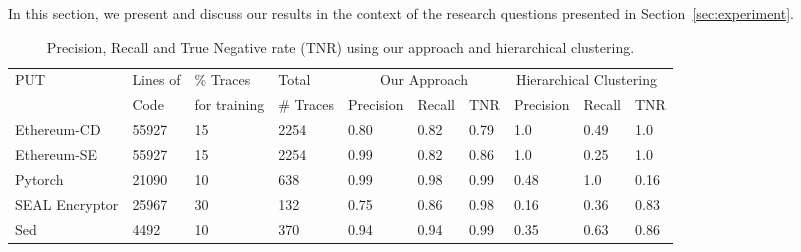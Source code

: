 
In this section, we present and discuss our results in the context of the research questions presented in Section~\ref{sec:experiment}.

\begin{table}[]
	\centering
	\small
	\begin{tabular}{|l|l|l|l|l|l|l@{\hskip 5mm}|l|l|l|}
		\hline
		PUT & Lines of & \% Traces & Total & \multicolumn{3}{c|}{Our Approach} & \multicolumn{3}{c|}{Hierarchical Clustering~\cite{almaghairbe2017separating}}\\
		& Code & for training &  \# Traces      & {Precision} & {Recall} & {TNR} & {Precision} & {Recall} & {TNR}\\ 
		\hline
		Ethereum-CD & 55927 & 15 & 2254 & 0.80 & 0.82 & 0.79 & 1.0 & 0.49 & 1.0 \\ %
		Ethereum-SE & 55927 & 15 & 2254 & 0.99 & 0.82 & 0.86 & 1.0 & 0.25 & 1.0 \\ %
		Pytorch & 21090 & 10 & 638 & 0.99 & 0.98 & 0.99 & 0.48 & 1.0 & 0.16 \\
		SEAL Encryptor & 25967 & 30 & 132 & 0.75 & 0.86 & 0.98 & 0.16 & 0.36 & 0.83 \\ %
		Sed & 4492 & 10  & 370 & 0.94 & 0.94 & 0.99 & 0.35 & 0.63 & 0.86 \\ \hline%
	\end{tabular}
	\caption{Precision, Recall and True Negative rate (TNR) using our approach and hierarchical clustering.} %
	\vspace{-17pt}
	\label{tab:results}
\end{table}


